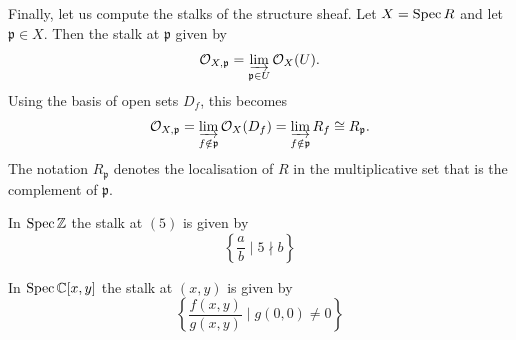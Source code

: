 Finally, let us compute the stalks of the structure sheaf.
Let $X = \operatorname{Spec} R$ and let \(\mathfrak{p}\in X\). Then the stalk at $\mathfrak{p}$ given by
    \[
        \mathcal{O}_{X,\mathfrak{p}}
        =
        \varinjlim_{\mathfrak{p}\in U}
        \mathcal{O}_X(U).
    \]
    Using the basis of open sets \(D_f\), this becomes
    \[
        \mathcal{O}_{X,\mathfrak{p}}
        =
        \varinjlim_{\substack{f\notin\mathfrak{p}}}
        \mathcal{O}_X(D_f)
        =
        \varinjlim_{\substack{f\notin\mathfrak{p}}}
        R_f
        \cong
        R_{\mathfrak{p}}.
    \]
    The notation \(R_{{\mathfrak{p}}}\) denotes the localisation of \(R\) in the multiplicative set that is the complement of \(\mathfrak p\).
\begin{example}
    In $\operatorname{Spec} \mathbb{Z}$ the stalk at $(5)$ is given by
    \[
    \left\{ \frac{a}{b} \mid 5\nmid b \right\}
    \] 
\end{example}
\begin{example}
    In $\operatorname{Spec} \mathbb{C}[x,y]$ the stalk at $(x,y)$ is given by
    \[
    \left\{ \frac{f(x,y)}{g(x,y)} \mid g(0,0)\neq 0 \right\}
    \] 
\end{example}

